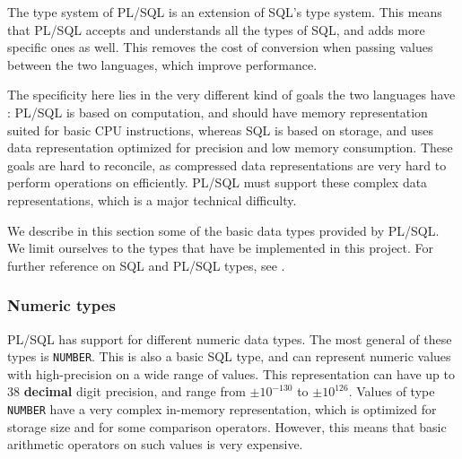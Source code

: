 \documentclass[twoside,11pt,a4paper]{article}
\newcommand{\pls}[1]{\small\texttt{#1}\normalsize}
\newcommand{\plstype}[1]{\pls{#1}}
\newcommand{\oranum}{\plstype{NUMBER}}
\begin{document}
The type system of PL/SQL is an extension of SQL's type system. This means that PL/SQL accepts and understands all the types of SQL, and adds more specific ones as well. This removes the cost of conversion when passing values between the two languages, which improve performance.


The specificity here lies in the very different kind of goals the two languages have : PL/SQL is based on computation, and should have memory representation suited for basic CPU instructions, whereas SQL is based on storage, and uses data representation optimized for precision and low memory consumption. These goals are hard to reconcile, as compressed data representations are very hard to perform operations on efficiently. PL/SQL must support these complex data representations, which is a major technical difficulty.


We describe in this section some of the basic data types provided by PL/SQL. We limit ourselves to the types that have be implemented in this project. For further reference on SQL and PL/SQL types, see \cite{plsdoc, sqldoc}.

\subsubsection{Numeric types}

\label{sec:numerictypes}

PL/SQL has support for different numeric data types. The most general of these types is \oranum{}. This is also a basic SQL type, and can represent numeric values with high-precision on a wide range of values. This representation can have up to 38 \textbf{decimal} digit precision, and range from $ \pm 10^{-130}$ to $\pm 10^{126}$. Values of type \oranum{} have a very complex in-memory representation, which is optimized for storage size and for some comparison operators. However, this means that basic arithmetic operators on such values is very expensive.
\end{document}
